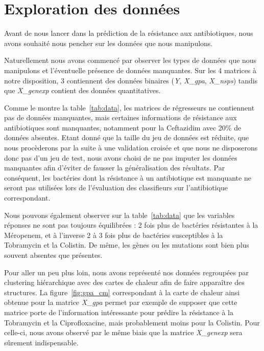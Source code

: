 \documentclass[11pt]{article}
\begin{document}
\hypertarget{exploration-donnees}{%
\section{Exploration des données}\label{exploration-donnees}}

  Avant de nous lancer dans la prédiction de la résistance aux antibiotiques, nous avons souhaité nous pencher sur les données que nous manipulons.

  Naturellement nous avons commencé par observer les types de données que nous manipulons et l'éventuelle présence de données manquantes.
  Sur les 4 matrices à notre disposition, 3 contiennent des données binaires (\textit{Y}, \textit{X\_gpa}, \textit{X\_nsps}) tandis que \textit{X\_genexp} contient des données quantitatives.

  Comme le montre la table~\ref{tab:data}, les matrices de régresseurs ne contiennent pas de données manquantes, mais certaines informations de résistance aux antibiotiques sont manquantes, notamment pour la Ceftazidim avec 20\% de données absentes.
  Etant donné que la taille du jeu de données est réduite, que nous procèderons par la suite à une validation croisée et que nous ne disposerons donc pas d'un jeu de test, nous avons choisi de ne pas imputer les données manquantes afin d'éviter de fausser la généralisation des résultats.
  Par conséquent, les bactéries dont la résistance à un antibiotique est manquante ne seront pas utilisées lors de l'évaluation des classifieurs sur l'antibiotique correspondant.

  Nous pouvons également observer sur la table~\ref{tab:data} que les variables réponses ne sont pas toujours équilibrées : 2 fois plus de bactéries résistantes à la Méropenem, et à l'inverse 2 à 3 fois plus de bactéries susceptibles à la Tobramycin et la Colistin.
  De même, les gènes ou les mutations sont bien plus souvent absentes que présentes.

  

  Pour aller un peu plus loin, nous avons représenté nos données regroupées par clustering hiérarchique avec des cartes de chaleur afin de faire apparaître des structures.
  La figure~\ref{fig:gpa_cm} correspondant à la carte de chaleur ainsi obtenue pour la matrice \textit{X\_gpa} permet par exemple de supposer que cette matrice porte de l'information intéressante pour prédire la résistance à la Tobramycin et la Ciprofloxacine, mais probablement moins pour la Colistin.
  Pour celle-ci, nous avons observé par le même biais que la matrice \textit{X\_genexp} sera sûrement indispensable.
\end{document}
